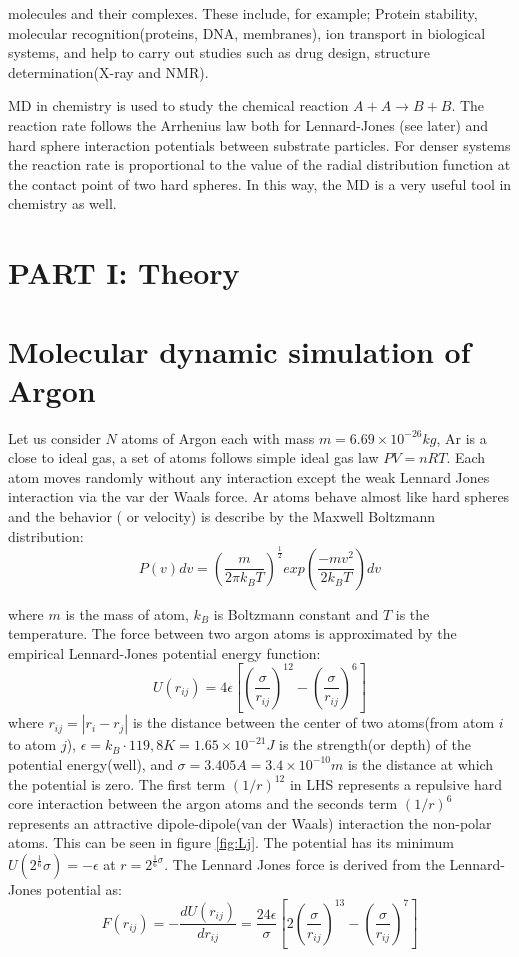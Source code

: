 \documentclass[a4paper]{article}
\begin{document}
molecules and their complexes. These include, for example; Protein stability, molecular recognition(proteins, DNA, membranes), ion transport in biological systems, and help to carry out studies such as drug design, structure determination(X-ray and NMR). 

MD in chemistry is used to study the chemical reaction $A+A \rightarrow B + B$. The reaction rate follows the Arrhenius law both for Lennard-Jones (see later) and hard sphere interaction potentials between substrate particles. For denser systems the reaction rate is proportional to the value of the radial distribution function at the contact point of two hard spheres. In this way, the MD is a very useful tool in chemistry as well. 


\newpage
\section*{PART I: Theory}
\section{Molecular dynamic simulation of Argon}
Let us consider $N$ atoms of Argon each with mass $m= 6.69\times 10^{-26}kg$, Ar is a close to ideal gas, a set of atoms follows simple ideal gas law $PV=nRT$. Each atom moves randomly without any interaction except the weak Lennard Jones interaction via the var der Waals force. Ar atoms behave almost like hard spheres and the behavior ( or velocity) is describe by the Maxwell Boltzmann distribution:
\begin{equation}
P(v)dv = \left(\frac{m}{2\pi k_B T}\right)^{\frac{1}{2}} exp\left(\frac{-mv^2}{2k_B T}\right)dv
\end{equation}

where $m$ is the mass of atom, $k_B$ is Boltzmann constant and $T$ is the temperature. The force between two argon atoms is approximated by the empirical Lennard-Jones potential energy function:
\begin{equation}
U(r_{ij}) = 4\epsilon \left[\left(\frac{\sigma}{r_{ij}}\right)^{12}-\left(\frac{\sigma}{r_{ij}}\right)^{6}\right]
\end{equation}
where $r_{ij} = \left |r_i - r_j \right |$ is the distance between the center of two atoms(from atom $i$ to atom $j$), $\epsilon = k_B \cdot 119,8K = 1.65\times 10^{-21}J$ is the strength(or depth) of the potential energy(well), and $\sigma = 3.405 A = 3.4\times 10^{-10}m$ is the distance at which the potential is zero. The first term $(1/r)^{12}$ in LHS represents a repulsive hard core interaction between the argon atoms and the seconds term $(1/r)^{6}$ represents an attractive dipole-dipole(van der Waals) interaction the non-polar atoms. This can be seen in figure \ref{fig:Lj}. The potential has its minimum $U(2^{\frac{1}{6}}\sigma) = -\epsilon$ at $r = 2^{\frac{1}{6}\sigma}$. The Lennard Jones force is derived from the Lennard-Jones potential as:
\begin{equation}
F(r_{ij}) = -\frac{dU(r_{ij})}{dr_{ij}} = \frac{24\epsilon}{\sigma} \left[2\left(\frac{\sigma}{r_{ij}}\right) ^{13}-\left(\frac{\sigma}{r_{ij}}\right)^{7}\right]
\end{equation}
\end{document}
